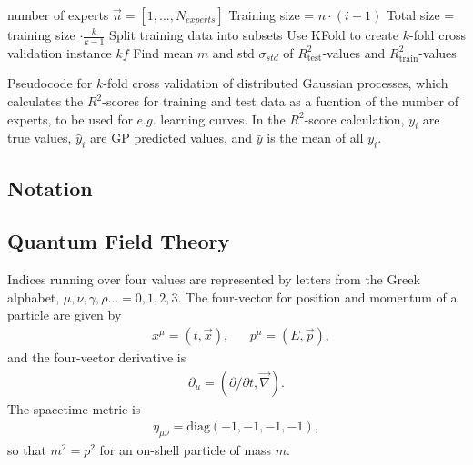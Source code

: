 \documentclass[twoside,english]{uiofysmaster}
\begin{document}
{\begin{algorithm}
number of experts $\vec{n} = [1,...,N_{experts}]$ \;
{
Training size =  $n \cdot (i+1)$\;
Total size = training size $\cdot \frac{k}{k-1}$\;
Split training data into subsets\;
Use KFold to create $k$-fold cross validation instance $kf$\;
Find mean $m$ and std $\sigma_{std}$ of $R^2_{\text{test}}$-values and $R^2_{\text{train}}$-values
}
 \caption{Pseudocode for $k$-fold cross validation of distributed Gaussian processes, which calculates the $R^2$-scores for training and test data as a fucntion of the number of experts, to be used for $e.g.$ learning curves. In the $R^2$-score calculation, $y_i$ are true values, $\hat{y}_i$ are GP predicted values, and $\bar{y}$ is the mean of all $y_i$.}
\label{Alg:: evaluating cross : Cross validation DGP}
\end{algorithm}








\begin{appendices}

\chapter{Notation}\label{Sec:: Appendix : Notation}

\section{Quantum Field Theory}

Indices running over four values are represented by letters from the Greek alphabet, $\mu, \nu, \gamma, \rho...=0,1,2,3$. The four-vector for position and momentum of a particle are given by
\begin{align}
& x^{\mu} = (t, \vec{x}), && p^{\mu} = (E, \vec{p}),
\end{align}
and the four-vector derivative is
\begin{align}
\partial_{\mu} = (\partial/ \partial t, \vec{\nabla}).
\end{align}
The spacetime metric is
\begin{align}
\eta_{\mu \nu} = \mathrm{diag} (+1, -1, -1, -1), 
\end{align}
so that $m^2 = p^2$ for an on-shell particle of mass $m$.


\end{appendices}}
\end{document}
